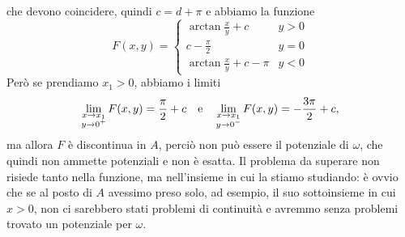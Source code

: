 che devono coincidere, quindi $c=d+\pi$ e abbiamo la funzione
\begin{equation}
	F(x,y)=
	\begin{cases}
		\arctan\frac{x}{y}+c	&y>0\\
		c-\frac{\pi}2			&y=0\\
		\arctan\frac{x}{y}+c-\pi	&y<0
	\end{cases}
\end{equation}
Però se prendiamo $x_1>0$, abbiamo i limiti
\begin{equation}
	\lim_{\substack{x\to x_1\\ y\to 0^+}}F(x,y)=\frac{\pi}2+c\quad\text{e}\quad\lim_{\substack{x\to x_1\\ y\to 0^-}}F(x,y)=-\frac{3\pi}2+c,
\end{equation}
ma allora $F$ è discontinua in $A$, perciò non può essere il potenziale di $\omega$, che quindi non ammette potenziali e non è esatta.
Il problema da superare non risiede tanto nella funzione, ma nell'insieme in cui la stiamo studiando: è ovvio che se al posto di $A$ avessimo preso solo, ad esempio, il suo sottoinsieme in cui $x>0$, non ci sarebbero stati problemi di continuità e avremmo senza problemi trovato un potenziale per $\omega$.

